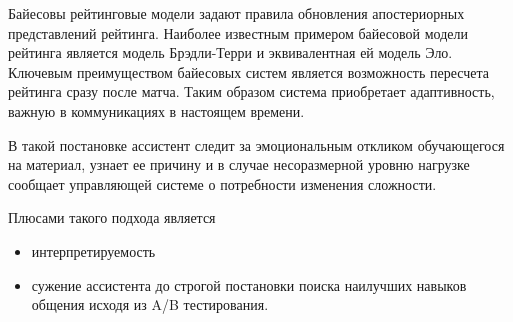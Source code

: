 Байесовы рейтинговые модели задают правила обновления апостериорных представлений рейтинга.
Наиболее известным примером байесовой модели рейтинга является модель Брэдли-Терри и эквивалентная ей модель Эло.
Ключевым преимуществом байесовых систем является возможность пересчета рейтинга сразу после матча.
 Таким образом система приобретает адаптивность, важную в коммуникациях в настоящем времени.

 В такой постановке ассистент следит за эмоциональным откликом обучающегося на материал,
узнает ее причину и в случае несоразмерной уровню нагрузке сообщает управляющей системе о потребности изменения сложности.

Плюсами такого подхода является \begin{itemize}
    \item интерпретируемость
    \item сужение ассистента до строгой постановки поиска наилучших навыков общения исходя из A/B тестирования.
\end{itemize}



